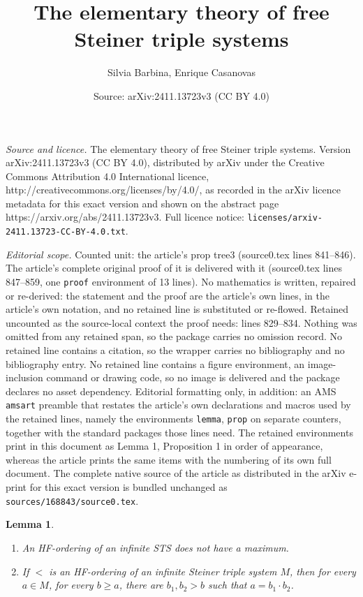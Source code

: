 \documentclass[10pt,a4paper]{amsart}
\title{The elementary theory of free Steiner triple systems}
\author{Silvia Barbina, Enrique Casanovas}
\date{Source: arXiv:2411.13723v3 (CC BY 4.0)}
\newtheorem{lemma}{Lemma}
\begin{document}
\maketitle

\noindent\emph{Source and licence.} The elementary theory of free Steiner triple systems. Version arXiv:2411.13723v3 (CC BY 4.0), distributed by arXiv under the Creative Commons Attribution 4.0 International licence, http://creativecommons.org/licenses/by/4.0/, as recorded in the arXiv licence metadata for this exact version and shown on the abstract page https://arxiv.org/abs/2411.13723v3. Full licence notice: \texttt{licenses/arxiv-2411.13723-CC-BY-4.0.txt}.\par\smallskip

\noindent\textit{Editorial scope.} Counted unit: the article's prop tree3 (source0.tex lines 841--846). The article's complete original proof of it is delivered with it (source0.tex lines 847--859, one \texttt{proof} environment of 13 lines). No mathematics is written, repaired or re-derived: the statement and the proof are the article's own lines, in the article's own notation, and no retained line is substituted or re-flowed.  Retained uncounted as the source-local context the proof needs: lines 829--834.  Nothing was omitted from any retained span, so the package carries no omission record.  No retained line contains a citation, so the wrapper carries no bibliography and no bibliography entry.  No retained line contains a figure environment, an image-inclusion command or drawing code, so no image is delivered and the package declares no asset dependency.  Editorial formatting only, in addition: an AMS \texttt{amsart} preamble that restates the article's own declarations and macros used by the retained lines, namely the environments \texttt{lemma}, \texttt{prop} on separate counters, together with the standard packages those lines need.  The retained environments print in this document as Lemma 1, Proposition 1 in order of appearance, whereas the article prints the same items with the numbering of its own full document.  The complete native source of the article as distributed in the arXiv e-print for this exact version is bundled unchanged as \texttt{sources/168843/source0.tex}.
\begin{lemma}\label{tree2}
	\begin{enumerate}
		\item An HF-ordering of an infinite STS does not have a maximum.
		\item If $<$ is an HF-ordering of an infinite Steiner triple system $M$, then for every $a\in M$, for every  $b \geq a$, there are $b_1,b_2>b$ such that  $a=b_1\cdot b_2$.
	\end{enumerate}
\end{lemma}
\end{document}
